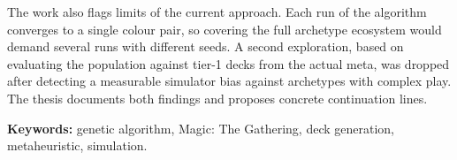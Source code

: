 The work also flags limits of the current approach. Each run of the algorithm converges to a single colour pair, so covering the full archetype ecosystem would demand several runs with different seeds. A second exploration, based on evaluating the population against tier-1 decks from the actual meta, was dropped after detecting a measurable simulator bias against archetypes with complex play. The thesis documents both findings and proposes concrete continuation lines.

\textbf{Keywords:} genetic algorithm, Magic: The Gathering, deck generation, metaheuristic, simulation.

